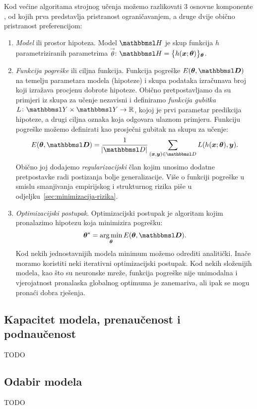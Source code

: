 \documentclass[utf8, diplomski, lmodern]{fer}
\begin{document}
Kod većine algoritama strojnog učenja možemo razlikovati 3 osnovne komponente \citep{Snajder:2014:SU}, od kojih prva predstavlja pristranost ograničavanjem, a druge dvije obično pristranost preferencijom:
\begin{enumerate}
	\item \emph{Model} ili prostor hipoteza. Model $\set H$ je skup funkcija $h$  parametriziranih parametrima $\vec\theta$: $\set H=\cbr{h(\vec x;\vec{\theta})}_{\vec{\theta}}$.
	\item \emph{Funkcija pogreške} ili ciljna funkcija. Funkcija pogreške $E(\vec{\theta,\set D})$ na temelju parametara modela (hipoteze) i skupa podataka izračunava broj koji izražava procjenu dobrote hipoteze. Obično pretpostavljamo da su primjeri iz skupa za učenje nezavisni i definiramo \emph{funkcija gubitka} $\funcdef{L}{\set Y\times\set Y}{\R}$, kojoj je prvi parametar predikcija hipoteze, a drugi ciljna oznaka koja odgovara ulaznom primjeru. Funkciju pogreške možemo definirati kao prosječni gubitak na skupu za učenje:
	\begin{align}
	E(\vec{\theta,\set D})=\frac{1}{\envert{\set D}}\sum_{(\vec x,\vec y)\in\set D} L(h(\vec x;\vec{\theta}),\vec y) \text{.}
	\end{align}
	Obično joj dodajemo \emph{regularizacijski} član kojim unosimo dodatne pretpostavke radi postizanja bolje generalizacije. Više o funkciji pogreške u smislu smanjivanja empirijskog i strukturnog rizika piše u odjeljku~\ref{sec:minimizacija-rizika}.
	\item \emph{Optimizacijski postupak}. Optimizacijski postupak je algoritam kojim pronalazimo hipotezu koja minimizira pogrešku:
	\begin{align}
	\vec\theta^* = \argmin_{\vec{\theta}} E(\vec{\theta,\set D}) \text{.}
	\end{align}
	Kod nekih jednostavnijih modela minimum možemo odrediti analitički. Inače moramo koristiti neki iterativni optimizacijski postupak. Kod nekih složenijih modela, kao što su neuronske mreže, funkcija pogreške nije unimodalna i vjerojatnost pronalaska globalnog optimuma je zanemariva, ali ipak se mogu pronaći dobra rješenja.
\end{enumerate}

\subsection{Kapacitet modela, prenaučenost i podnaučenost}
TODO

\subsection{Odabir modela}
TODO
\end{document}
